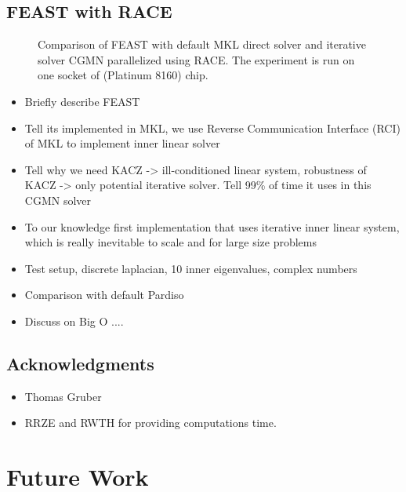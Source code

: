 \subsection{FEAST with RACE}
\begin{figure}[b]
	\centering
	\scalebox{0.56}{}
	\caption{Comparison of FEAST with default \acrshort{MKL} direct solver and 
		iterative solver CGMN parallelized using \acrshort{RACE}. The experiment is
		run on one socket of \SKX (Platinum 8160) chip.}
\end{figure}
\begin{itemize}
	\item Briefly describe FEAST
	\item Tell its implemented in MKL, we use Reverse Communication Interface (RCI) of
		\acrshort{MKL} to implement inner linear solver
	\item Tell why we need KACZ -> ill-conditioned linear system, robustness of KACZ -> only potential iterative solver. Tell 99\% of time it uses in this CGMN solver
	\item To our knowledge first implementation that uses iterative inner linear system, which is really inevitable to scale and for large size problems
	\item  Test setup, discrete laplacian, 10 inner eigenvalues, complex numbers 
	\item Comparison with default Pardiso
	\item Discuss on Big O ....
\end{itemize}

\subsection{Acknowledgments}
\begin{itemize}
	\item Thomas Gruber
	\item RRZE and RWTH for providing computations time.
\end{itemize}

\section{Future Work}

